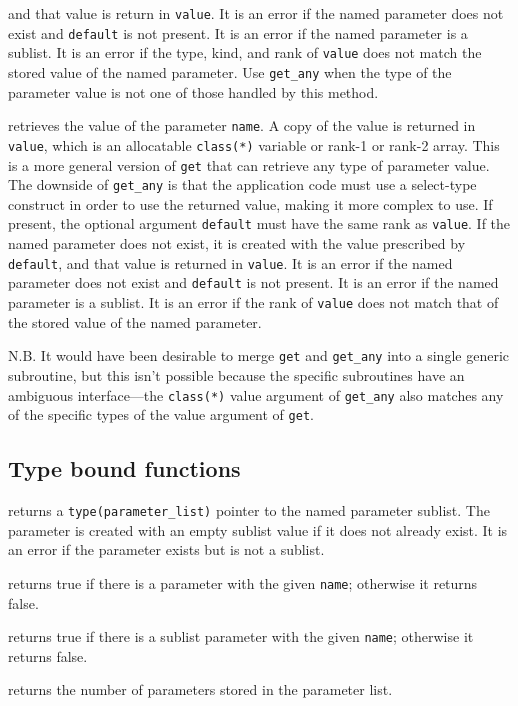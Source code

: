\documentclass[11pt]{article}
\begin{document}
\begin{description}[style=nextline]
  and that value is return in \texttt{value}.  It is an error if the named
  parameter does not exist and \texttt{default} is not present.  It is an
  error if the named parameter is a sublist. It is an error if the type, kind,
  and rank of \texttt{value} does not match the stored value of the named
  parameter.  Use \texttt{get_any} when the type of the parameter value is not
  one of those handled by this method.
\item[\texttt{get_any(name, value \Lbr,default\Rbr\ \Lbr,stat \Lbr,errmsg\Rbr\Rbr)}]
  retrieves the value of the parameter \texttt{name}.  A copy of the value is
  returned in \texttt{value}, which is an allocatable \texttt{class(*)} variable
  or rank-1 or rank-2 array.  This is a more general version of \texttt{get} that can
  retrieve any type of parameter value.  The downside of \texttt{get_any} is
  that the application code must use a select-type construct in order to use
  the returned value, making it more complex to use.  If present, the optional
  argument \texttt{default} must have the same rank as \texttt{value}.  If the
  named parameter does not exist, it is created with the value prescribed by
  \texttt{default}, and that value is returned in \texttt{value}.  It is an
  error if the named parameter does not exist and \texttt{default} is not
  present.  It is an error if the named parameter is a sublist.  It is an
  error if the rank of \texttt{value} does not match that of the stored value
  of the named parameter. \par
  N.B. It would have been desirable to merge \texttt{get} and \texttt{get_any}
  into a single generic subroutine, but this isn't possible because the
  specific subroutines have an ambiguous interface---the \texttt{class(*)}
  value argument of \texttt{get_any} also matches any of the specific types
  of the value argument of \texttt{get}.
\end{description}

\subsection{Type bound functions}
\begin{description}[style=nextline]\setlength{\itemsep}{0pt}
\item[\texttt{sublist(name \Lbr,stat \Lbr,errmsg\Rbr\Rbr)}]
  returns a \texttt{type(parameter_list)} pointer to the named parameter
  sublist.  The parameter is created with an empty sublist value if it
  does not already exist.  It is an error if the parameter exists but is
  not a sublist.
\item[\texttt{is_parameter(name)}]
  returns true if there is a parameter with the given \texttt{name};
  otherwise it returns false.
\item[\texttt{is_sublist(name)}]
  returns true if there is a sublist parameter with the given \texttt{name};
  otherwise it returns false.
\item[\texttt{count()}]
  returns the number of parameters stored in the parameter list.
\end{description}
\end{document}
